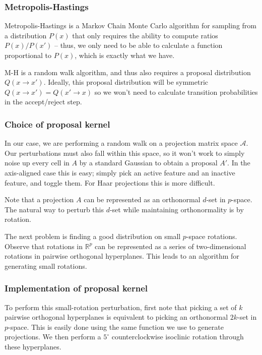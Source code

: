 \documentclass[ejs,preprint]{imsart}
\begin{document}
\subsubsection{Metropolis-Hastings}

Metropolis-Hastings \cite{MRRTT53} is a Markov Chain Monte Carlo algorithm for sampling from a distribution $P(x)$ that only requires the ability to compute ratios $P(x)/P(x')$ -- thus, we only need to be able to calculate a function proportional to $P(x)$, which is exactly what we have.

M-H is a random walk algorithm, and thus also requires a proposal distribution $Q(x\to x')$. Ideally, this proposal distribution will be symmetric $Q(x\to x')=Q(x'\to x)$ so we won't need to calculate transition probabilities in the accept/reject step.

\subsubsection{Choice of proposal kernel}

In our case, we are performing a random walk on a projection matrix space $\mathcal A$. Our perturbations must also fall within this space, so it won't work to simply noise up every cell in $A$ by a standard Gaussian to obtain a proposal $A'$. In the axis-aligned case this is easy; simply pick an active feature and an inactive feature, and toggle them. For Haar projections this is more difficult.

Note that a projection $A$ can be represented as an orthonormal $d$-set in $p$-space. The natural way to perturb this $d$-set while maintaining orthonormality is by rotation.

The next problem is finding a good distribution on small $p$-space rotations. Observe that rotations in $\mathbb R^p$ can be represented as a series of two-dimensional rotations in pairwise orthogonal hyperplanes. This leads to an algorithm for generating small rotations.

\subsubsection{Implementation of proposal kernel}

To perform this small-rotation perturbation, first note that picking a set of $k$ pairwise orthogonal hyperplanes is equivalent to picking an orthonormal $2k$-set in $p$-space. This is easily done using the same function we use to generate projections. We then perform a $5^\circ$ counterclockwise isoclinic rotation through these hyperplanes.
\end{document}
